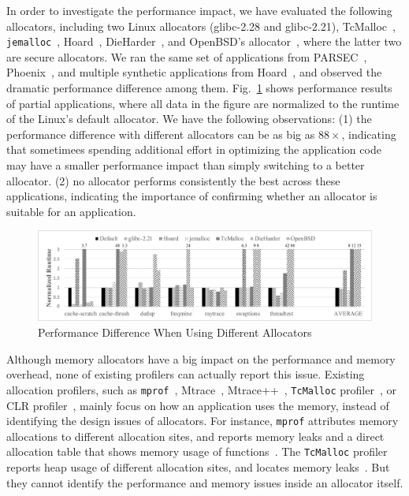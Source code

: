 In order to investigate the performance impact, we have evaluated the following allocators, including two Linux allocators (glibc-2.28 and glibc-2.21), TcMalloc~\citep{tcmalloc}, \texttt{jemalloc}~\citep{jemalloc}, Hoard~\citep{Hoard}, DieHarder~\citep{DieHarder}, and OpenBSD's allocator~\citep{openbsd}, where the latter two are secure allocators. We ran the same set of applications from PARSEC~\citep{parsec},  Phoenix~\citep{phoenix}, and multiple synthetic applications from Hoard~\cite{Hoard}, and observed the dramatic performance difference among them. Fig.~\ref{fig:motivation} shows performance results of partial applications, where all data in the figure are normalized to the runtime of the Linux's default allocator. We have the following observations: (1) the performance difference with different allocators can be as big as $88\times$, indicating that sometimees spending additional effort in optimizing the application code may have a smaller performance impact than simply switching to a better allocator. (2) no allocator performs consistently the best across these applications, indicating the importance of confirming whether an allocator is suitable for an application. 



\begin{figure}[!ht]
\centering
\includegraphics[width=5in]{figures/regular-performance}
\caption{Performance Difference When Using Different Allocators\label{fig:motivation}}
\end{figure}


Although memory allocators have a big impact on the performance and memory overhead, none of existing profilers can actually report this issue. Existing allocation profilers, such as \texttt{mprof}~\citep{Zorn:1988:MAP:894814}, Mtrace~\citep{mtrace}, Mtrace++~\citep{Lee:2000:DMM:786772.787150}, \texttt{TcMalloc} profiler~\citep{tcmalloc-profiler}, or CLR profiler~\citep{lupasc2014dynamic}, mainly focus on how an application uses the memory, instead of identifying the design issues of allocators. For instance, \texttt{mprof} attributes memory allocations to different allocation sites, and reports memory leaks and a direct allocation table that shows memory usage of functions~\citep{Zorn:1988:MAP:894814}. The \texttt{TcMalloc} profiler reports heap usage of different allocation sites, and locates memory leaks~\citep{tcmalloc-profiler}. But they cannot identify the performance and memory issues inside an allocator itself. 

